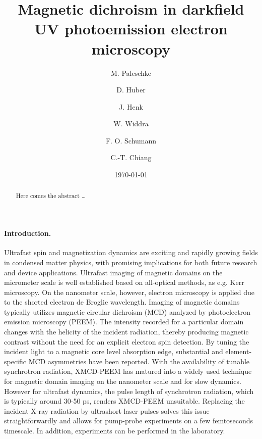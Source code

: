 \documentclass[prl,twocolumn,floatfix]{revtex4-2}
\begin{document}
\title{Magnetic dichroism in darkfield UV photoemission electron microscopy}

\author{M. Paleschke}
\author{D. Huber}
\author{J. Henk}
\author{W. Widdra}

\author{F. O. Schumann}

\author{C.-T. Chiang}

\date{\today}

\begin{abstract}
Here comes the abstract \ldots
\end{abstract}

\pacs{}

\maketitle

\paragraph{Introduction.} Ultrafast spin and magnetization dynamics are exciting and rapidly growing fields in condensed matter physics, with promising implications for both future research and device applications. Ultrafast imaging of magnetic domains on the micrometer scale is well established based on all-optical methods, as e.g. Kerr microscopy. On the nanometer scale, however, electron microscopy is applied due to the shorted electron de Broglie wavelength. 
Imaging of magnetic domains typically utilizes magnetic circular dichroism (MCD) analyzed by photoelectron emission microscopy (PEEM). The intensity recorded for a particular domain changes with the helicity of the incident radiation, thereby producing magnetic contrast without the need for an explicit electron spin detection. By tuning the incident light  to a magnetic core level absorption edge, substantial and element-specific MCD asymmetries have been reported. With the availability of tunable synchrotron radiation, XMCD-PEEM has matured into a widely used technique for magnetic domain imaging on the nanometer scale and for slow dynamics. However for ultrafast dynamics, the pulse length of synchrotron radiation, which is typically around 30-50 ps, renders XMCD-PEEM unsuitable. 
Replacing the incident X-ray radiation by ultrashort laser pulses solves this issue straightforwardly and allows for pump-probe experiments on a few femtoseconds timescale. In addition, experiments can be performed in the laboratory. 
\end{document}
